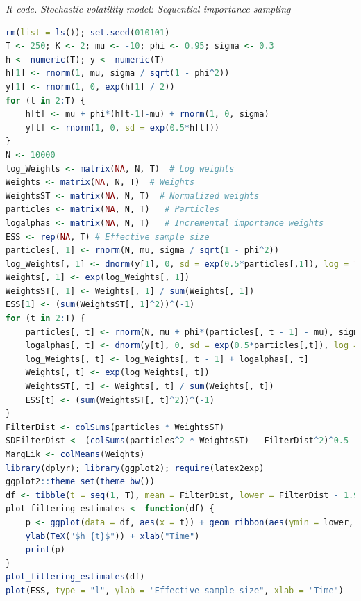 \begin{enumerate}[leftmargin=*]
\begin{tcolorbox}[enhanced,width=4.67in,center upper,
	fontupper=\large\bfseries,drop shadow southwest,sharp corners]
	\textit{R code. Stochastic volatility model:  Sequential importance sampling}
	\begin{VF}
		\begin{lstlisting}[language=R]
rm(list = ls()); set.seed(010101)
T <- 250; K <- 2; mu <- -10; phi <- 0.95; sigma <- 0.3
h <- numeric(T); y <- numeric(T)
h[1] <- rnorm(1, mu, sigma / sqrt(1 - phi^2))
y[1] <- rnorm(1, 0, exp(h[1] / 2))
for (t in 2:T) {
	h[t] <- mu + phi*(h[t-1]-mu) + rnorm(1, 0, sigma)
	y[t] <- rnorm(1, 0, sd = exp(0.5*h[t]))
}
N <- 10000
log_Weights <- matrix(NA, N, T)  # Log weights
Weights <- matrix(NA, N, T)  # Weights 
WeightsST <- matrix(NA, N, T)  # Normalized weights 
particles <- matrix(NA, N, T)   # Particles
logalphas <- matrix(NA, N, T)   # Incremental importance weights
ESS <- rep(NA, T) # Effective sample size
particles[, 1] <- rnorm(N, mu, sigma / sqrt(1 - phi^2))
log_Weights[, 1] <- dnorm(y[1], 0, sd = exp(0.5*particles[,1]), log = TRUE)  
Weights[, 1] <- exp(log_Weights[, 1])
WeightsST[, 1] <- Weights[, 1] / sum(Weights[, 1])
ESS[1] <- (sum(WeightsST[, 1]^2))^(-1)
for (t in 2:T) {
	particles[, t] <- rnorm(N, mu + phi*(particles[, t - 1] - mu), sigma)  # Sample from proposal
	logalphas[, t] <- dnorm(y[t], 0, sd = exp(0.5*particles[,t]), log = TRUE) 
	log_Weights[, t] <- log_Weights[, t - 1] + logalphas[, t]
	Weights[, t] <- exp(log_Weights[, t])
	WeightsST[, t] <- Weights[, t] / sum(Weights[, t])
	ESS[t] <- (sum(WeightsST[, t]^2))^(-1)
}
FilterDist <- colSums(particles * WeightsST)
SDFilterDist <- (colSums(particles^2 * WeightsST) - FilterDist^2)^0.5
MargLik <- colMeans(Weights)
library(dplyr); library(ggplot2); require(latex2exp)
ggplot2::theme_set(theme_bw())
df <- tibble(t = seq(1, T), mean = FilterDist, lower = FilterDist - 1.96*SDFilterDist, upper = FilterDist + 1.96*SDFilterDist, x_true = h)
plot_filtering_estimates <- function(df) {
	p <- ggplot(data = df, aes(x = t)) + geom_ribbon(aes(ymin = lower, ymax = upper), alpha = 1, fill = "lightblue") + geom_line(aes(y = x_true), colour = "black", alpha = 1, linewidth = 0.5) + geom_line(aes(y = mean), colour = "blue", linewidth = 0.5) +
	ylab(TeX("$h_{t}$")) + xlab("Time")
	print(p)
}
plot_filtering_estimates(df)
plot(ESS, type = "l", ylab = "Effective sample size", xlab = "Time")
\end{lstlisting}
	\end{VF}
\end{tcolorbox} 


\end{enumerate}
